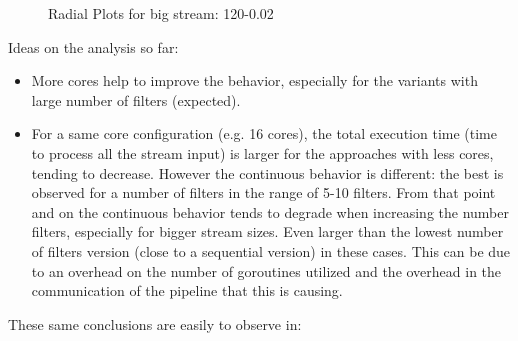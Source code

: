 \documentclass[12pt,a4paper]{article}
\begin{document}
\begin{figure}[H]
{\begin{minipage}{0.5\textwidth}
            \caption*{}
        \end{minipage}
    }

    \caption{Radial Plots for big stream: 120-0.02}
    \label{img:exps-read-input-variants}
\end{figure}

Ideas on the analysis so far:

\begin{itemize}
    \item More cores help to improve the behavior, especially for the variants with large number of filters (expected).
    \item For a same core configuration (e.g. 16 cores), the total execution time (time to process all the stream input) is larger for the approaches with less cores, tending to decrease. However the continuous behavior is different: the best is observed for a number of filters in the range of 5-10 filters. From that point and on the continuous behavior tends to degrade when increasing the number filters, especially for bigger stream sizes. Even larger than the lowest number of filters version (close to a sequential version) in these cases. This can be due to an overhead on the number of goroutines utilized and the overhead in the communication of the pipeline that this is causing.
\end{itemize}


These same conclusions are easily to observe in:
\end{document}
